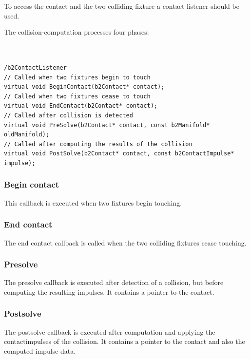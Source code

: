 \documentclass[10pt,a4paper,DIV=11]{scrreprt}
\begin{document}
To access the contact and the two colliding fixture a contact listener should be used.

The collision-computation processes four phases: \\

   \\
\\

\begin{lstlisting}[caption={Contact listener methods},label=lst:collision-contact]
/b2ContactListener
// Called when two fixtures begin to touch
virtual void BeginContact(b2Contact* contact);
// Called when two fixtures cease to touch
virtual void EndContact(b2Contact* contact);
// Called after collision is detected
virtual void PreSolve(b2Contact* contact, const b2Manifold* oldManifold);
// Called after computing the results of the collision
virtual void PostSolve(b2Contact* contact, const b2ContactImpulse* impulse);
\end{lstlisting}

\subsubsection*{Begin contact}
This callback is executed when two fixtures begin touching.

\subsubsection*{End contact}
The end contact callback is called when the two colliding fixtures cease touching.

\subsubsection*{Presolve}
The presolve callback is executed after detection of a collision, but before computing the resulting impulses. It contains a pointer to the contact.

\subsubsection*{Postsolve}
The postsolve callback is executed after computation and applying the contactimpulses of the collision. It contains a pointer to the contact and also the computed impulse data.
\end{document}
